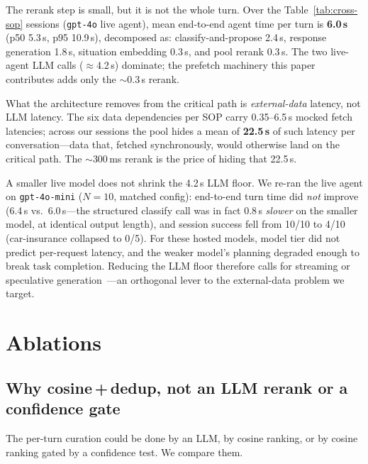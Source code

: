 \documentclass[10pt,twocolumn]{article}
\begin{document}
The rerank step is small, but it is not the whole turn. Over the Table~\ref{tab:cross-sop} sessions (\texttt{gpt-4o} live agent), mean end-to-end agent time per turn is \textbf{6.0\,s} (p50 5.3\,s, p95 10.9\,s), decomposed as: classify-and-propose 2.4\,s, response generation 1.8\,s, situation embedding 0.3\,s, and pool rerank 0.3\,s. The two live-agent LLM calls ($\approx$4.2\,s) dominate; the prefetch machinery this paper contributes adds only the $\sim$0.3\,s rerank.

What the architecture removes from the critical path is \emph{external-data} latency, not LLM latency. The six data dependencies per SOP carry 0.35--6.5\,s mocked fetch latencies; across our sessions the pool hides a mean of \textbf{22.5\,s} of such latency per conversation---data that, fetched synchronously, would otherwise land on the critical path. The $\sim$300\,ms rerank is the price of hiding that 22.5\,s.

A smaller live model does not shrink the 4.2\,s LLM floor. We re-ran the live agent on \texttt{gpt-4o-mini} ($N{=}10$, matched config): end-to-end turn time did \emph{not} improve (6.4\,s vs.\ 6.0\,s---the structured classify call was in fact 0.8\,s \emph{slower} on the smaller model, at identical output length), and session success fell from 10/10 to 4/10 (car-insurance collapsed to 0/5). For these hosted models, model tier did not predict per-request latency, and the weaker model's planning degraded enough to break task completion. Reducing the LLM floor therefore calls for streaming or speculative generation~\cite{lts2026,relays2s2026}---an orthogonal lever to the external-data problem we target.

\section{Ablations}
\label{sec:ablations}

\subsection{Why cosine\,+\,dedup, not an LLM rerank or a confidence gate}
\label{sec:abl-rerank}

The per-turn curation could be done by an LLM, by cosine ranking, or by cosine ranking gated by a confidence test. We compare them.
\end{document}
